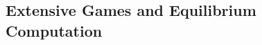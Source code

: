 \documentclass[letterpaper]{article}
\begin{document}


\subsection{Extensive Games and Equilibrium Computation}
\end{document}

